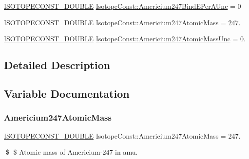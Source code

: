 \begin{DoxyCompactItemize}
\mbox{\hyperlink{group___isotope_const-_macros_ga8f45a7272ce02c0b4c65c44636ed719a}{I\+S\+O\+T\+O\+P\+E\+C\+O\+N\+S\+T\+\_\+\+D\+O\+U\+B\+LE}} \mbox{\hyperlink{group___isotope_const-_americium-_am247_gacd6519f809f7c46c221489ec17690f42}{Isotope\+Const\+::\+Americium247\+Bind\+E\+Per\+A\+Unc}} = 0
\item 
\mbox{\hyperlink{group___isotope_const-_macros_ga8f45a7272ce02c0b4c65c44636ed719a}{I\+S\+O\+T\+O\+P\+E\+C\+O\+N\+S\+T\+\_\+\+D\+O\+U\+B\+LE}} \mbox{\hyperlink{group___isotope_const-_americium-_am247_ga591372806a7055e71001401b2fcadff0}{Isotope\+Const\+::\+Americium247\+Atomic\+Mass}} = 247.
\item 
\mbox{\hyperlink{group___isotope_const-_macros_ga8f45a7272ce02c0b4c65c44636ed719a}{I\+S\+O\+T\+O\+P\+E\+C\+O\+N\+S\+T\+\_\+\+D\+O\+U\+B\+LE}} \mbox{\hyperlink{group___isotope_const-_americium-_am247_gab373deaad9ef489696868516d3b2cb96}{Isotope\+Const\+::\+Americium247\+Atomic\+Mass\+Unc}} = 0.
\end{DoxyCompactItemize}


\subsection{Detailed Description}


\subsection{Variable Documentation}
\mbox{\label{group___isotope_const-_americium-_am247_ga591372806a7055e71001401b2fcadff0}} 
\subsubsection{\texorpdfstring{Americium247\+Atomic\+Mass}{Americium247AtomicMass}}
{\footnotesize\ttfamily \mbox{\hyperlink{group___isotope_const-_macros_ga8f45a7272ce02c0b4c65c44636ed719a}{I\+S\+O\+T\+O\+P\+E\+C\+O\+N\+S\+T\+\_\+\+D\+O\+U\+B\+LE}} Isotope\+Const\+::\+Americium247\+Atomic\+Mass = 247.}

\$ \$ Atomic mass of Americium-\/247 in amu. \mbox{\label{group___isotope_const-_americium-_am247_gab373deaad9ef489696868516d3b2cb96}} 
